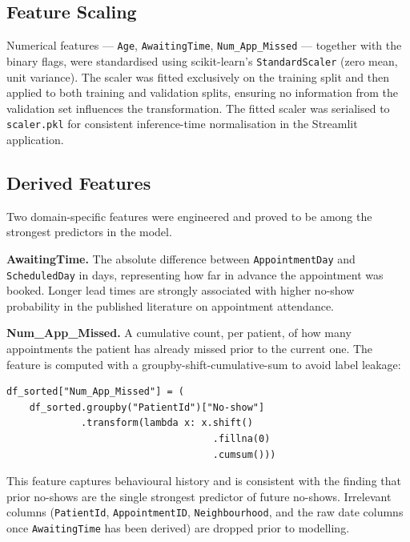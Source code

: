 \documentclass[11pt,a4paper]{article}
\begin{document}
\subsection{Feature Scaling}

Numerical features --- \texttt{Age}, \texttt{AwaitingTime},
\texttt{Num\_App\_Missed} --- together with the binary flags, were
standardised using scikit-learn's \texttt{StandardScaler} (zero mean, unit
variance). The scaler was fitted exclusively on the training split and then
applied to both training and validation splits, ensuring no information from
the validation set influences the transformation. The fitted scaler was
serialised to \texttt{scaler.pkl} for consistent inference-time
normalisation in the Streamlit application.

\subsection{Derived Features}

Two domain-specific features were engineered and proved to be among the
strongest predictors in the model.

\textbf{AwaitingTime.} The absolute difference between
\texttt{AppointmentDay} and \texttt{ScheduledDay} in days, representing how
far in advance the appointment was booked. Longer lead times are strongly
associated with higher no-show probability in the published literature on
appointment attendance.

\textbf{Num\_App\_Missed.} A cumulative count, per patient, of
how many appointments the patient has already missed prior to the current
one. The feature is computed with a groupby-shift-cumulative-sum to avoid
label leakage:

\begin{lstlisting}
df_sorted["Num_App_Missed"] = (
    df_sorted.groupby("PatientId")["No-show"]
             .transform(lambda x: x.shift()
                                    .fillna(0)
                                    .cumsum()))
\end{lstlisting}

This feature captures behavioural history and is consistent with the
finding that prior no-shows are the single strongest predictor of future
no-shows. Irrelevant columns (\texttt{PatientId}, \texttt{AppointmentID},
\texttt{Neighbourhood}, and the raw date columns once \texttt{AwaitingTime}
has been derived) are dropped prior to modelling.

\end{document}
